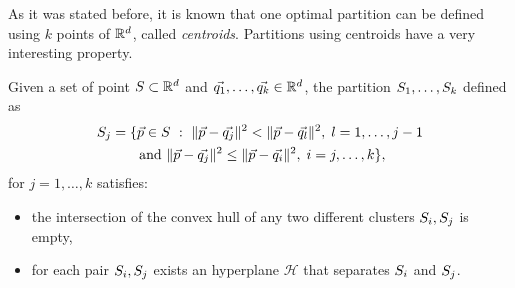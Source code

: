 \documentclass{article}
\newcommand{\cH}{\mathcal{H}}
\begin{document}
As it was stated before, it is known that one optimal partition can be
defined using 
$k$ points of $\mathbb{R}^d$, called \textit{centroids}. Partitions using
centroids have a very interesting property.
\begin{lemma}
\label{lem:properties_clusters}
  Given a set of point $S\subset \mathbb{R}^{d}$ and
  $\vec{q_1},\ldots,\vec{q_k}\in\mathbb{R}^d$, the partition $S_1,\ldots,
  S_k$ defined as 
  \begin{multline*}
  \Set_j=\{\vec{p}\in\Set\ :\ 
  \|\vec{p}-\vec{q_j}\|^2< \|\vec{p}-\vec{q_l}\|^2,\; l =1,\ldots, j-1\\
  \text{ and }
  \|\vec{p}-\vec{q_j}\|^2\le \|\vec{p}-\vec{q_i}\|^2,\; i =j,\ldots, k \},
  \end{multline*}
  for $j = 1,\ldots, k$ satisfies:
  \begin{itemize}
  \item the intersection of the convex hull of any two different
    clusters $S_i,S_j$ is empty,
  \item for each pair $S_i, S_j$ exists an hyperplane $\cH$ that 
    separates $S_i$ and $S_j$.
  \end{itemize}
\end{lemma}
\end{document}
